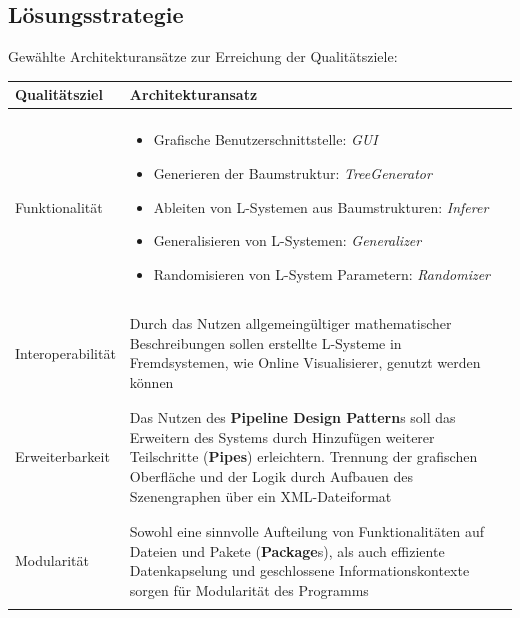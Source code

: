 \subsection{Lösungsstrategie}
Gewählte Architekturansätze zur Erreichung der Qualitätsziele:
\begin{center}
    \begin{tabular}{l|l}
        \textbf{Qualitätsziel} & \textbf{Architekturansatz} \\
        \hline \\
        Funktionalität &
        \begin{minipage}[t]{0.8\textwidth}
            \begin{itemize}
                \item Grafische Benutzerschnittstelle: \textit{GUI}
                \item Generieren der Baumstruktur: \textit{TreeGenerator}
                \item Ableiten von L-Systemen aus Baumstrukturen: \textit{Inferer}
                \item Generalisieren von L-Systemen: \textit{Generalizer}
                \item Randomisieren von L-System Parametern: \textit{Randomizer}
            \end{itemize}
        \end{minipage} \\
        \\ \hline \\
        Interoperabilität &
        \begin{minipage}[t]{0.8\textwidth}
            Durch das Nutzen allgemeingültiger mathematischer Beschreibungen sollen erstellte
            L-Systeme in Fremdsystemen, wie Online Visualisierer, genutzt werden können
        \end{minipage} \\
        \\ \hline \\
        Erweiterbarkeit &
        \begin{minipage}[t]{0.8\textwidth}
            Das Nutzen des \textbf{Pipeline Design Pattern}s soll das Erweitern des Systems durch
            Hinzufügen weiterer Teilschritte (\textbf{Pipes}) erleichtern.
            Trennung der grafischen Oberfläche und der Logik durch Aufbauen des Szenengraphen über ein
            XML-Dateiformat
        \end{minipage} \\
        \\ \hline \\
        Modularität &
        \begin{minipage}[t]{0.8\textwidth}
            Sowohl eine sinnvolle Aufteilung von Funktionalitäten auf Dateien und Pakete (\textbf{Package}s), als
            auch effiziente Datenkapselung und geschlossene Informationskontexte sorgen für Modularität des
            Programms
        \end{minipage} \\
        \\ \hline
    \end{tabular}
\end{center}

